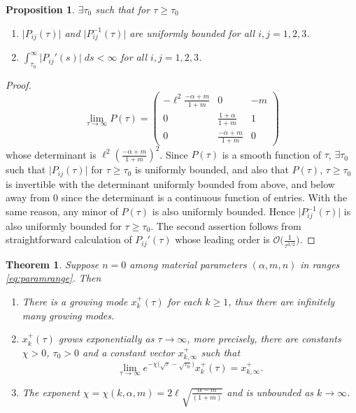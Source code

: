 \documentclass[a4paper,11pt]{article}
\def\l{{\ell}}
\newtheorem{theorem}{Theorem}
\newtheorem{proposition}{Proposition}[section]
\theoremstyle{remark}
\begin{document}
\begin{proposition} \label{prop:factor}$\exists \tau_0$ such that for $\tau\ge\tau_0$
 \begin{enumerate}
  \item  $\big|P_{ij}(\tau)\big|$ and $\big|P^{-1}_{ij}(\tau)\big|$ are uniformly bounded for all $i,j=1,2,3$.
  \item $\displaystyle \int_{\tau_0}^\infty \big|P_{ij}'(s)\big|\; ds < \infty$ for all $i,j=1,2,3$.
 \end{enumerate}
\end{proposition}
\begin{proof}
$$ \lim_{\tau \rightarrow \infty} P(\tau) = \begin{pmatrix} -\l^2\frac{-\alpha+m}{1+m}& 0 & -m\\ 0 & \frac{1+\alpha}{1+m} & 1\\ 0 & \frac{-\alpha+m}{1+m} & 0\end{pmatrix}$$
whose determinant is $\l^2 \left(\frac{-\alpha+m}{1+m}\right)^2$. Since $P(\tau)$ is a smooth function of $\tau$, $\exists \tau_0$ such that $\big|P_{ij}(\tau)\big|$ for $\tau\ge\tau_0$ is uniformly bounded, and also that $P(\tau)$, $\tau\ge\tau_0$ is invertible with the determinant uniformly bounded from above, and below away from $0$ since the determinant is a continuous function of entries. With the same reason, any minor of $P(\tau)$ is also uniformly bounded. Hence $\big|P^{-1}_{ij}(\tau)\big|$ is also uniformly bounded for $\tau\ge \tau_0$. The second assertion follows from straightforward calculation of $P_{ij}'(\tau)$ whose leading order is $\mathcal{O}\big(\frac{1}{\tau^{3/2}}\big)$.
\end{proof}




\begin{theorem} \label{thm:Hadamard} Suppose $n=0$ among material parameters $(\alpha,m,n)$ in ranges \eqref{eq:paramrange}. Then
  \begin{enumerate}
    \item There is a growing mode $x_k^+(\tau)$ for each $k\ge1$, thus there are infinitely many growing modes.
    \item $x_k^+(\tau)$ grows exponentially as $\tau \rightarrow \infty$, more precisely, there are constants $\chi>0$, $\tau_0>0$ and a constant vector $x_{k,\infty}^+$ such that
    \begin{equation}
      \lim_{\tau \rightarrow \infty} e^{-\chi \big(\sqrt{\tau}-\sqrt{\tau_0}\big)} x_k^+(\tau) = x_{k,\infty}^+.
    \end{equation}
    \item The exponent $\chi=\chi(k,\alpha,m)=2\l\sqrt{\frac{\alpha-m}{(1+m)}}$ and is unbounded as $k \rightarrow \infty$.
  \end{enumerate}
\end{theorem}
\end{document}
